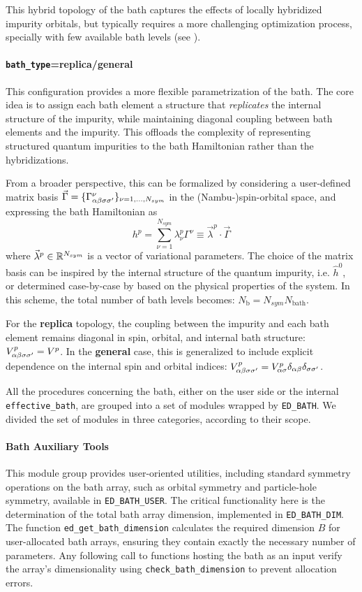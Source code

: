 \documentclass[edipack2.tex]{subfiles}
\begin{document}
This hybrid topology of the bath captures the effects of locally
hybridized impurity orbitals, but typically requires a more
challenging optimization process, specially
with few available bath levels (see ). 

\paragraph{{\tt bath\_type}={\bf replica}/{\bf general}}
This configuration provides a more flexible parametrization of the 
bath. The core idea is to assign each bath element a structure 
that {\it replicates} the internal structure of the impurity, while 
maintaining diagonal coupling between bath elements and the impurity. 
This offloads the complexity of representing structured quantum 
impurities to the bath Hamiltonian rather than the hybridizations.

From a broader perspective, this can be formalized by considering  
a user-defined matrix basis
$\vec{\Gamma}=\{ \Gamma^\nu_{\alpha\beta\sigma\sigma'} \}_{\nu=1,\dots,N_{sym}}$ in the (Nambu-)spin-orbital
space, and expressing the bath Hamiltonian as
$$
h^p = \sum_{\nu=1}^{N_{sym}} \lambda^p_\nu
\Gamma^\nu\equiv \vec{\lambda}^p\cdot \vec{\Gamma}
$$
where $\vec{\lambda}^p\in\mathbb{R}^{N_{sym}}$ is a vector of variational parameters. 
The choice of the matrix basis can be inspired by the internal structure
of the quantum impurity, i.e. $\hat{h}^0$, or determined
case-by-case by based on the physical properties of the system.
In this scheme, the total number of bath levels becomes: $N_\mathrm{b}
= N_{sym} N_\mathrm{bath}$.



For the {\bf replica} topology, the coupling between the impurity 
and each bath element remains diagonal in spin, orbital, and internal 
bath structure: $V^p_{\alpha\beta\sigma\sigma'} = V^p$.
In the {\bf general} case, this is generalized to include explicit 
dependence on the internal spin and orbital indices: $V^p_{\alpha\beta\sigma\sigma'}
= V^p_{\alpha\sigma}\delta_{\alpha\beta}\delta_{\sigma\sigma'}$. 



All the procedures concerning the bath, either on the user side or the
internal {\tt effective\_bath}, are grouped into a set of modules
wrapped by {\tt ED\_BATH}. We divided the set of modules in three
categories, according to their scope.

\paragraph{Bath Auxiliary Tools}
This module group provides user-oriented utilities, including 
standard symmetry operations on the bath array, such as orbital 
symmetry and particle-hole symmetry, available in 
{\tt ED\_BATH\_USER}. The critical functionality here is the 
determination of the total bath array dimension, implemented in 
{\tt ED\_BATH\_DIM}. The function {\tt ed\_get\_bath\_dimension} 
calculates the required dimension $B$ for user-allocated bath 
arrays, ensuring they contain exactly the necessary number of 
parameters. Any following call
to functions hosting the bath as an input verify the array's 
dimensionality using {\tt check\_bath\_dimension} to prevent 
allocation errors.
\end{document}
